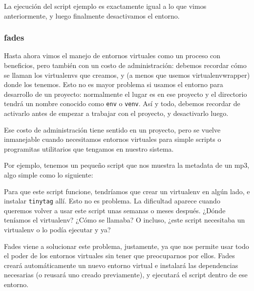 La ejecución del script ejemplo es exactamente igual a lo que vimos anteriormente, y luego finalmente desactivamos el entorno.



\subsubsection{fades}\label{subsub:fades}

Hasta ahora vimos el manejo de entornos virtuales como un proceso con beneficios, pero también con un costo de administración: debemos recordar cómo se llaman los virtualenvs que creamos, y (a menos que usemos virtualenvwrapper) donde los tenemos. Esto no es mayor problema si usamos el entorno para desarrollo de un proyecto: normalmente el lugar es en ese proyecto y el directorio tendrá un nombre conocido como \texttt{env} o \texttt{venv}. Así y todo, debemos recordar de activarlo antes de empezar a trabajar con el proyecto, y desactivarlo luego.

Ese costo de administración tiene sentido en un proyecto, pero se vuelve inmanejable cuando necesitamos entornos virtuales para simple scripts o programitas utilitarios que tengamos en nuestro sistema.

Por ejemplo, tenemos un pequeño script que nos muestra la metadata de un mp3, algo simple como lo siguiente:


Para que este script funcione, tendríamos que crear un virtualenv en algún lado, e instalar \texttt{tinytag} allí. Esto no es problema. La dificultad aparece cuando queremos volver a usar este script unas semanas o meses después. ¿Dónde teníamos el virtualenv? ¿Cómo se llamaba? O incluso, ¿este script necesitaba un virtualenv o lo podía ejecutar y ya?

Fades viene a solucionar este problema, justamente, ya que nos permite usar todo el poder de los entornos virtuales sin tener que preocuparnos por ellos. Fades creará automáticamente un nuevo entorno virtual e instalará las dependencias necesarias (o reusará uno creado previamente), y ejecutará el script dentro de ese entorno.

